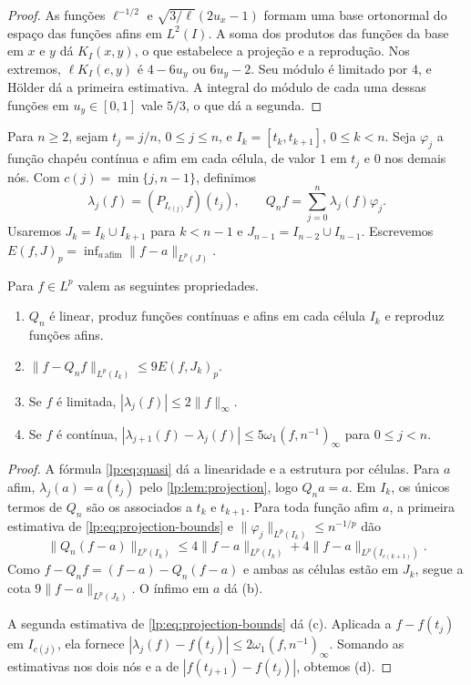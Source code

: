 \documentclass[12pt,a4paper]{article}
\begin{document}
\begin{proof}
As funções $\ell^{-1/2}$ e $\sqrt{3/\ell}(2u_x-1)$ formam uma base ortonormal do espaço das funções afins em $L^2(I)$. A soma dos produtos das funções da base em $x$ e $y$ dá $K_I(x,y)$, o que estabelece a projeção e a reprodução. Nos extremos, $\ell K_I(e,y)$ é $4-6u_y$ ou $6u_y-2$. Seu módulo é limitado por $4$, e Hölder dá a primeira estimativa. A integral do módulo de cada uma dessas funções em $u_y\in[0,1]$ vale $5/3$, o que dá a segunda.
\end{proof}

Para $n\ge2$, sejam $t_j=j/n$, $0\le j\le n$, e $I_k=[t_k,t_{k+1}]$, $0\le k<n$. Seja $\varphi_j$ a função chapéu contínua e afim em cada célula, de valor $1$ em $t_j$ e $0$ nos demais nós. Com $c(j)=\min\{j,n-1\}$, definimos
\begin{equation}
 \lambda_j(f)=(P_{I_{c(j)}}f)(t_j),
 \qquad Q_nf=\sum_{j=0}^n\lambda_j(f)\varphi_j .
 \label{lp:eq:quasi}
\end{equation}
Usaremos $J_k=I_k\cup I_{k+1}$ para $k<n-1$ e $J_{n-1}=I_{n-2}\cup I_{n-1}$. Escrevemos $E(f,J)_p=\inf_{a\,\mathrm{afim}}\|f-a\|_{L^p(J)}$.

\begin{lema}
\label{lp:lem:quasi}
Para $f\in L^p$ valem as seguintes propriedades.
\begin{enumerate}[label=(\alph*)]
 \item $Q_n$ é linear, produz funções contínuas e afins em cada célula $I_k$ e reproduz funções afins.
 \item $\|f-Q_nf\|_{L^p(I_k)}\le9E(f,J_k)_p$.
 \item Se $f$ é limitada, $|\lambda_j(f)|\le2\|f\|_\infty$.
 \item Se $f$ é contínua, $|\lambda_{j+1}(f)-\lambda_j(f)|\le5\omega_1(f,n^{-1})_\infty$ para $0\le j<n$.
\end{enumerate}
\end{lema}

\begin{proof}
A fórmula \eqref{lp:eq:quasi} dá a linearidade e a estrutura por células. Para $a$ afim, $\lambda_j(a)=a(t_j)$ pelo \cref{lp:lem:projection}, logo $Q_na=a$. Em $I_k$, os únicos termos de $Q_n$ são os associados a $t_k$ e $t_{k+1}$. Para toda função afim $a$, a primeira estimativa de \eqref{lp:eq:projection-bounds} e $\|\varphi_j\|_{L^p(I_k)}\le n^{-1/p}$ dão
\[
 \|Q_n(f-a)\|_{L^p(I_k)}
 \le4\|f-a\|_{L^p(I_k)}+4\|f-a\|_{L^p(I_{c(k+1)})}.
\]
Como $f-Q_nf=(f-a)-Q_n(f-a)$ e ambas as células estão em $J_k$, segue a cota $9\|f-a\|_{L^p(J_k)}$. O ínfimo em $a$ dá (b).

A segunda estimativa de \eqref{lp:eq:projection-bounds} dá (c). Aplicada a $f-f(t_j)$ em $I_{c(j)}$, ela fornece
$|\lambda_j(f)-f(t_j)|\le2\omega_1(f,n^{-1})_\infty$. Somando as estimativas nos dois nós e a de $|f(t_{j+1})-f(t_j)|$, obtemos (d).
\end{proof}
\end{document}
